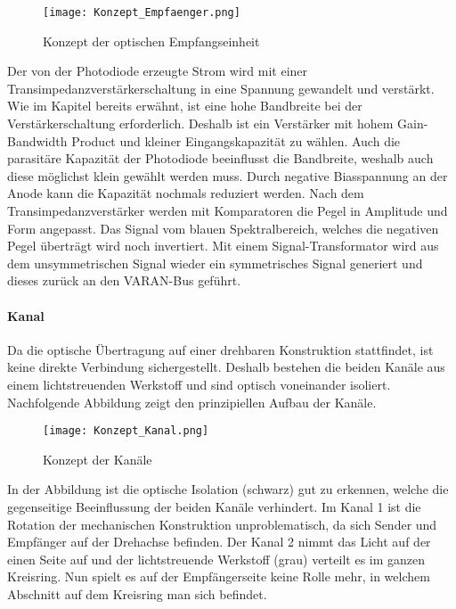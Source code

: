 \begin{figure}[h]
	\centering
	\texttt{[image: Konzept\_Empfaenger.png]}
	\caption{Konzept der optischen Empfangseinheit}\label{fig:Konzept_Empfaenger}
\end{figure}

Der von der Photodiode erzeugte Strom wird mit einer Transimpedanzverstärkerschaltung in eine Spannung gewandelt und verstärkt. Wie im Kapitel  bereits erwähnt, ist eine hohe Bandbreite bei der Verstärkerschaltung erforderlich. Deshalb ist ein Verstärker mit hohem Gain-Bandwidth Product und kleiner Eingangskapazität zu wählen. Auch die parasitäre Kapazität der Photodiode beeinflusst die Bandbreite, weshalb auch diese möglichst klein gewählt werden muss. Durch negative Biasspannung an der Anode kann die Kapazität nochmals reduziert werden.
\newline
Nach dem Transimpedanzverstärker werden mit Komparatoren die Pegel in Amplitude und Form angepasst. Das Signal vom blauen Spektralbereich, welches die negativen Pegel überträgt wird noch invertiert. Mit einem Signal-Transformator wird aus dem unsymmetrischen Signal wieder ein symmetrisches Signal generiert und dieses zurück an den VARAN-Bus geführt.

\paragraph{Kanal}
Da die optische Übertragung auf einer drehbaren Konstruktion stattfindet, ist keine direkte Verbindung sichergestellt. Deshalb bestehen die beiden Kanäle aus einem lichtstreuenden Werkstoff und sind optisch voneinander isoliert. Nachfolgende Abbildung zeigt den prinzipiellen Aufbau der Kanäle.

\begin{figure}[h]
	\centering
	\texttt{[image: Konzept\_Kanal.png]}
	\caption{Konzept der Kanäle}\label{fig:Konzept_Kanal}
\end{figure}

In der Abbildung ist die optische Isolation (schwarz) gut zu erkennen, welche die gegenseitige Beeinflussung der beiden Kanäle verhindert. Im Kanal 1 ist die Rotation der mechanischen Konstruktion unproblematisch, da sich Sender und Empfänger auf der Drehachse befinden. Der Kanal 2 nimmt das Licht auf der einen Seite auf und der lichtstreuende Werkstoff (grau) verteilt es im ganzen Kreisring. Nun spielt es auf der Empfängerseite keine Rolle mehr, in welchem Abschnitt auf dem Kreisring man sich befindet.

